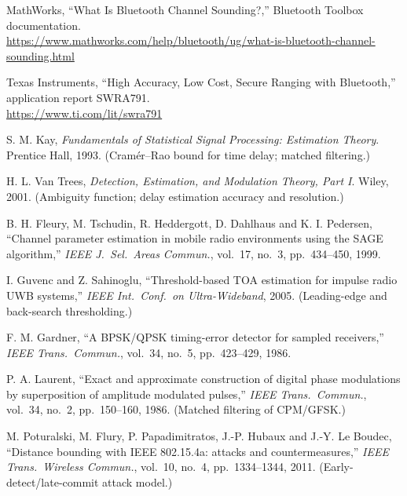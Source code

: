 \documentclass[11pt,a4paper]{article}
\begin{document}
\begin{enumerate}[label={[\arabic*]},leftmargin=2.2em,itemsep=3pt]
\item MathWorks, ``What Is Bluetooth Channel Sounding?,'' Bluetooth Toolbox documentation.\\
  {\small\url{https://www.mathworks.com/help/bluetooth/ug/what-is-bluetooth-channel-sounding.html}}

\item Texas Instruments, ``High Accuracy, Low Cost, Secure Ranging with Bluetooth,'' application
  report SWRA791.\\
  {\small\url{https://www.ti.com/lit/swra791}}

\item S. M. Kay, \emph{Fundamentals of Statistical Signal Processing: Estimation Theory}.
  Prentice Hall, 1993. (Cram\'er--Rao bound for time delay; matched filtering.)

\item H. L. Van Trees, \emph{Detection, Estimation, and Modulation Theory, Part I}. Wiley, 2001.
  (Ambiguity function; delay estimation accuracy and resolution.)

\item B. H. Fleury, M. Tschudin, R. Heddergott, D. Dahlhaus and K. I. Pedersen, ``Channel parameter
  estimation in mobile radio environments using the SAGE algorithm,'' \emph{IEEE J.\ Sel.\ Areas
  Commun.}, vol.\ 17, no.\ 3, pp.\ 434--450, 1999.

\item I. Guvenc and Z. Sahinoglu, ``Threshold-based TOA estimation for impulse radio UWB systems,''
  \emph{IEEE Int.\ Conf.\ on Ultra-Wideband}, 2005. (Leading-edge and back-search thresholding.)

\item F. M. Gardner, ``A BPSK/QPSK timing-error detector for sampled receivers,'' \emph{IEEE Trans.\
  Commun.}, vol.\ 34, no.\ 5, pp.\ 423--429, 1986.

\item P. A. Laurent, ``Exact and approximate construction of digital phase modulations by
  superposition of amplitude modulated pulses,'' \emph{IEEE Trans.\ Commun.}, vol.\ 34, no.\ 2,
  pp.\ 150--160, 1986. (Matched filtering of CPM/GFSK.)

\item M. Poturalski, M. Flury, P. Papadimitratos, J.-P. Hubaux and J.-Y. Le Boudec, ``Distance
  bounding with IEEE 802.15.4a: attacks and countermeasures,'' \emph{IEEE Trans.\ Wireless
  Commun.}, vol.\ 10, no.\ 4, pp.\ 1334--1344, 2011. (Early-detect/late-commit attack model.)
\end{enumerate}
\end{document}
